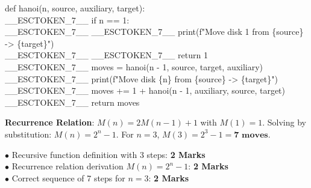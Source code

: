 \begin{solutionbox}
\begin{pycode}
def hanoi(n, source, auxiliary, target):\\
\_\_ESCTOKEN\_7\_\_ if n == 1:\\
\_\_ESCTOKEN\_7\_\_ \_\_ESCTOKEN\_7\_\_ print(f"Move disk 1 from \{source\} -> \{target\}")\\
\_\_ESCTOKEN\_7\_\_ \_\_ESCTOKEN\_7\_\_ return 1\\
\_\_ESCTOKEN\_7\_\_ moves = hanoi(n - 1, source, target, auxiliary)\\
\_\_ESCTOKEN\_7\_\_ print(f"Move disk \{n\} from \{source\} -> \{target\}")\\
\_\_ESCTOKEN\_7\_\_ moves += 1 + hanoi(n - 1, auxiliary, source, target)\\
\_\_ESCTOKEN\_7\_\_ return moves
\end{pycode}
\textbf{Recurrence Relation}: $M(n) = 2M(n-1) + 1$ with $M(1) = 1$.
Solving by substitution: $M(n) = 2^n - 1$. For $n = 3$, $M(3) = 2^3 - 1 = \mathbf{7\text{ moves}}$.
\begin{markingrubric}
$\bullet$ Recursive function definition with 3 steps: \textbf{2 Marks}\\
$\bullet$ Recurrence relation derivation $M(n) = 2^n - 1$: \textbf{2 Marks}\\
$\bullet$ Correct sequence of 7 steps for $n=3$: \textbf{2 Marks}
\end{markingrubric}
\end{solutionbox}

\newpage
